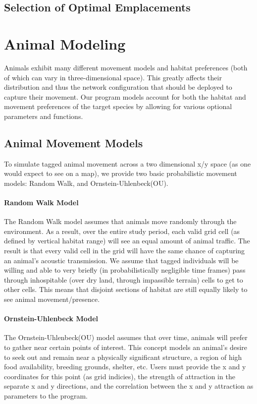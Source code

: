 \subsection{Selection of Optimal Emplacements}




\section{Animal Modeling}
Animals exhibit many different movement models and habitat preferences (both of which can vary in three-dimensional space).  This greatly affects their distribution and thus the network configuration that should be deployed to capture their movement.  Our program models account for both the habitat and movement preferences of the target species by allowing for various optional parameters and functions.

\subsection{Animal Movement Models}
 To simulate tagged animal movement across a two dimensional x/y space (as one would expect to see on a map), we provide two basic probabilistic movement models: Random Walk, and Ornstein-Uhlenbeck(OU).  

\paragraph{Random Walk Model}
The Random Walk model assumes that animals move randomly through the environment.  As a result, over the entire study period, each valid grid cell (as defined by vertical habitat range) will see an equal amount of animal traffic.  The result is that every valid cell  in the grid will have the same chance of capturing an animal's acoustic transmission.  We assume that tagged individuals will be willing and able to very briefly (in probabilistically negligible time frames) pass through inhospitable (over dry land, through impassible terrain) cells to get to other cells.  This means that disjoint sections of habitat are still equally likely to see animal movement/presence.

\paragraph{Ornstein-Uhlenbeck Model}
The Ornstein-Uhlenbeck(OU) model\cite{OU} assumes that over time, animals will prefer to gather near certain points of interest.  This concept models an animal's desire to seek out and remain near a physically significant structure, a region of high food availability, breeding grounds, shelter, etc.  Users must provide the x and y coordinates for this point (as grid indicies), the strength of attraction in the separate x and y directions, and the correlation between the x and y attraction as parameters to the program.  


